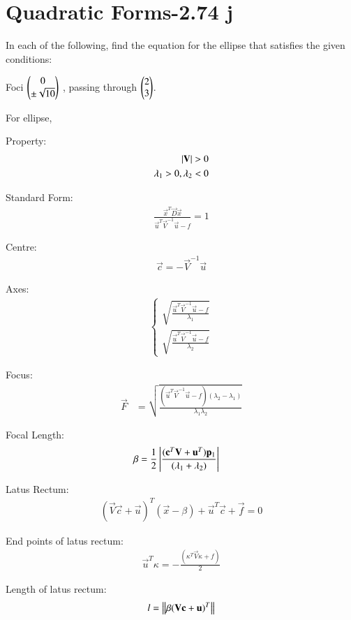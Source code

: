 \documentclass[journal,12pt,twocolumn]{IEEEtran}
\begin{document}
\section{Quadratic Forms-2.74 j}

In each of the following, find the equation for
the ellipse that satisfies the given conditions:

Foci $\begin{pmatrix}0 \\ \pm \sqrt{10}\end{pmatrix}$ , passing through $\begin{pmatrix}2\\3\end{pmatrix}$.


\begin{lemma}
For ellipse,

Property:
\begin{align}
    \left\vert\mathbf{V}\right\vert > 0
    \\
    \lambda_1>0,\lambda_2<0
\end{align}

Standard Form:
\begin{align}
    \frac{\vec{x}^T\vec{D}\vec{x}}{\vec{u}^T\vec{V}^{-1}\vec{u}-f}=1 \label{eq1}
\end{align}

Centre:
\begin{align}
    \vec{c} = -\vec{V}^{-1}\vec{u}
\end{align}

Axes:
\begin{align}
\begin{cases}
    \sqrt{\frac{\vec{u}^T\vec{V}^{-1}\vec{u}-f}{\lambda_1}}
    \\
    \sqrt{\frac{\vec{u}^T\vec{V}^{-1}\vec{u}-f}{\lambda_2}}
\end{cases}
\end{align}

Focus:
\begin{align}
    \vec{F} &= \sqrt{\frac{(\vec{u}^T\vec{V}^{-1}\vec{u}-f)(\lambda_2-\lambda_1)}{\lambda_1\lambda_2}}
\end{align}

Focal Length:
\begin{align}
    \beta &= \frac{1}{2}\left\vert\frac{(\mathbf{c}^T\mathbf{V}+\mathbf{u}^T)\mathbf{p}_1}{(\lambda_1+\lambda_2)}\right\vert 
\end{align}

Latus Rectum:
\begin{align}
    (\vec{V}\vec{c}+\vec{u})^T(\vec{x} -\beta) + \vec{u}^T\vec{c} + \vec{f} = 0
\end{align}

End points of latus rectum:
\begin{align}
    \vec{u}^T\kappa = -\frac{(\kappa^T\vec{V}\kappa + f )}{2}
\end{align}

Length of latus rectum:
\begin{align}
   l=\left\lVert\beta(\mathbf{V}\mathbf{c}+\mathbf{u})^T\right\rVert 
\end{align}
\end{lemma}
\end{document}
